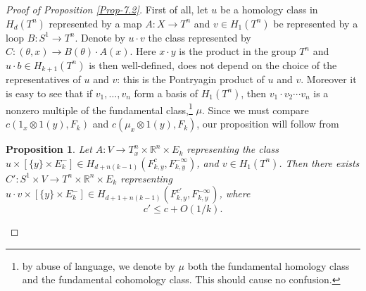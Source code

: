 \documentclass[JEP,XML,SOM,NoFloatCountersInSection,Unicode,published]{cedram}
\numberwithin{equation}{section}
\theoremstyle{plain}
\newtheorem{proposition}[theorem]{Proposition}
\theoremstyle{definition}
\theoremstyle{remark}
\begin{document}
\begin{proof}[Proof of Proposition \ref{Prop-7.2}]
First of all, let $u$ be a homology class in $H_d(T^n)$ represented by a map $A: X \to T^n$ and $v \in H_1(T^n)$ be represented by a loop $B: S^1 \to T^n$. Denote by $u\cdot v$ the class represented by $C: (\theta,x) \to B(\theta)\cdot A(x)$. Here $x\cdot y$ is the product in the group $T^n$ and $u \cdot b \in H_{k+1}(T^n)$ is then well-defined, \ie does not depend on the choice of the representatives of $u$ and $v$: this is the Pontryagin product of $u$ and $v$. Moreover it is easy to see that if $v_1,\dots,v_n$ form a basis of $H_1(T^n)$, then $v_1\cdot v_2\cdots v_n$ is a nonzero multiple of the fundamental class,\footnote{by abuse of language, we denote by $\mu$ both the fundamental homology class and the fundamental cohomology class. This should cause no confusion.} $\mu$. Since we must compare $c(1_x\otimes 1(y),F_k)$ and $c(\mu_x\otimes 1(y), F_k)$, our proposition will follow from
\begin{proposition} \label{Prop-7.4}
Let $A:V \to T^n_x\times {\mathbb R}^n \times E_k$ representing the class $u\times [\{y\} \times E_k^-] \in H_{d+n(k-1)}(F_{k,y}^c,F_{k,y}^{-\infty})$, and $v\in H_1(T^n)$. Then there exists $C':S^1\times V \to T^n\times {\mathbb R}^n \times E_k$ representing $u\cdot v \times [\{y\} \times E_k^-] \in H_{d+1+n(k-1)}(F_{k,y}^{c'},F_{k,y}^{-\infty})$, where
\[
c' \leq c +O(1/k).
\]
\end{proposition}


\end{proof}
\end{document}
